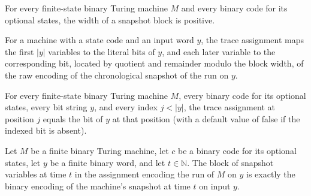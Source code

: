 \begin{lemma}
\label{Complexity.clA5Width_pos}
\leanok
{}
For every finite-state binary Turing machine $M$ and every binary code for its optional
states, the width of a snapshot block is positive.
\end{lemma}

\begin{definition}
\label{Complexity.clA5TraceAssignment}
\leanok
{}
For a machine with a state code and an input word $y$, the trace assignment maps the first $|y|$ variables to the literal bits of $y$, and each later variable to the corresponding bit, located by quotient and remainder modulo the block width, of the raw encoding of the chronological snapshot of the run on $y$.
\end{definition}

\begin{lemma}
\label{Complexity.clA5Trace_input}
\leanok
{}
For every finite-state binary Turing machine $M$, every binary code for its optional
states, every bit string $y$, and every index $j<|y|$, the trace assignment at position
$j$ equals the bit of $y$ at that position (with a default value of false if the indexed
bit is absent).
\end{lemma}

\begin{lemma}
\label{Complexity.clA5Trace_block}
\leanok
{}
Let $M$ be a finite binary Turing machine, let $c$ be a binary code for its optional
states, let $y$ be a finite binary word, and let $t\in\mathbb{N}$. The block of snapshot
variables at time $t$ in the assignment encoding the run of $M$ on $y$ is exactly the
binary encoding of the machine's snapshot at time $t$ on input $y$.
\end{lemma}

